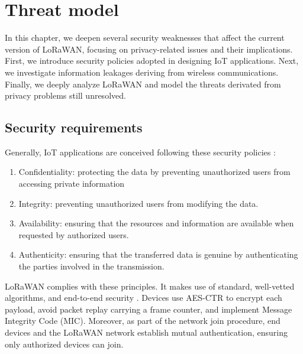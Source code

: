 \chapter{Threat model}
\label{model}
In this chapter, we deepen several security weaknesses that affect the current version of LoRaWAN, focusing on privacy-related issues and their implications. 
\\
First, we introduce security policies adopted in designing IoT applications. Next, we investigate information leakages deriving from wireless communications. Finally, we deeply analyze LoRaWAN and model the threats derivated from privacy problems still unresolved.

\section{Security requirements}
Generally, IoT applications are conceived following these security policies \cite{securing_iot}:
\begin{enumerate}
	\item Confidentiality: protecting the data by preventing unauthorized users from accessing private information
	\item Integrity: preventing unauthorized users from modifying the data.
	\item Availability: ensuring that the resources and information are available when requested by authorized users.
	\item Authenticity: ensuring that the transferred data is genuine by authenticating the parties involved in the transmission.
\end{enumerate}
LoRaWAN complies with these principles. It makes use of standard, well-vetted algorithms, and end-to-end security \cite{Moraes2021ASR}. Devices use AES-CTR to encrypt each payload, avoid packet replay carrying a frame counter, and implement Message Integrity Code (MIC). Moreover, as part of the network join procedure, end devices and the LoRaWAN network establish mutual authentication, ensuring only authorized devices can join.

